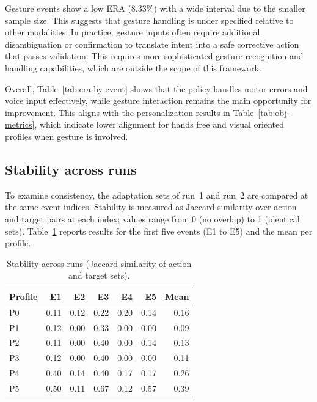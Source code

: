 Gesture events show a low ERA (8.33\%) with a wide interval due to the smaller sample size. This suggests that gesture handling is under specified relative to other modalities. In practice, gesture inputs often require additional disambiguation or confirmation to translate intent into a safe corrective action that passes validation. This requires more sophisticated gesture recognition and handling capabilities, which are outside the scope of this framework.

Overall, Table~\ref{tab:era-by-event} shows that the policy handles motor errors and voice input effectively, while gesture interaction remains the main opportunity for improvement. This aligns with the personalization results in Table~\ref{tab:obj-metrics}, which indicate lower alignment for hands free and visual oriented profiles when gesture is involved.

\subsection{Stability across runs}
\label{sec:stability-runs}
To examine consistency, the adaptation sets of run~1 and run~2 are compared at the same event indices. Stability is measured as Jaccard similarity over action and target pairs at each index; values range from 0 (no overlap) to 1 (identical sets). Table~\ref{tab:stability} reports results for the first five events (E1 to E5) and the mean per profile.

\begin{table}[H]
\centering
\caption{Stability across runs (Jaccard similarity of action and target sets).}
\label{tab:stability}
\begin{tabular}{lrrrrrr}
\toprule
\textbf{Profile} & \textbf{E1} & \textbf{E2} & \textbf{E3} & \textbf{E4} & \textbf{E5} & \textbf{Mean} \\
\midrule
P0 & 0.11 & 0.12 & 0.22 & 0.20 & 0.14 & 0.16 \\
P1 & 0.12 & 0.00 & 0.33 & 0.00 & 0.00 & 0.09 \\
P2 & 0.11 & 0.00 & 0.40 & 0.00 & 0.14 & 0.13 \\
P3 & 0.12 & 0.00 & 0.40 & 0.00 & 0.00 & 0.11 \\
P4 & 0.40 & 0.14 & 0.40 & 0.17 & 0.17 & 0.26 \\
P5 & 0.50 & 0.11 & 0.67 & 0.12 & 0.57 & 0.39 \\
\bottomrule
\end{tabular}
\end{table}

